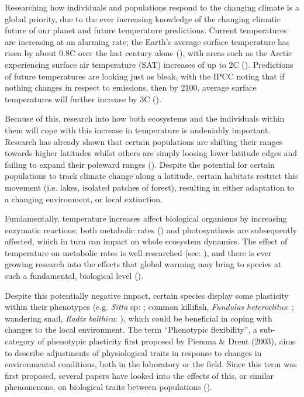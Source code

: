 \documentclass[../../Paper.tex]{subfiles}
\begin{document}
Researching how individuals and populations respond to the changing climate is a global priority,
due to the ever increasing knowledge of the changing climatic future of our planet 
and future temperature predictions. Current temperatures are 
increasing at an alarming rate; the Earth's average surface temperature has risen
by about 0.8\degree C over the last century alone (\cite{ipcc_climate_2014}),
with areas such as the Arctic experiencing surface air temperature (SAT)
increases of up to 2\degree C (\cite{przybylak_recent_2007}). Predictions 
of future temperatures are looking just as bleak, with the IPCC noting 
that if nothing changes in respect to emissions, then by 2100, average surface
temperatures will further increase by 3\degree C (\cite{ipcc_climate_2014}).

Because of this, research into how both ecosystems and the individuals
within them will cope with this increase in temperature is undeniably 
important. Research has already shown that certain populations are 
shifting their ranges towards higher latitudes whilst others
 are simply loosing lower latitude edges and failing to expand their poleward ranges
(\cite{chen_rapid_2011, sunday_thermal-safety_2014, kerr_climate_2015}). Despite 
the potential for certain populations to track climate change along a latitude,
certain habitats restrict this movement (i.e. lakes, isolated patches of forest),
resulting in either adaptation to a changing environment, or local extinction.

Fundamentally, temperature increases affect biological organisms by increasing enzymatic 
reactions; both metabolic rates (\cite{gillooly_effects_2001}) and photosynthesis are subsequently 
affected, which in turn can impact 
on whole ecosystem dynamics. The effect of temperature
on metabolic rates is well researched (see: \cite{brown_toward_2004,price_metabolic_2010}), 
and there is  ever growing research into the effects that global warming may bring to species at
such a fundamental, biological level (\cite{clusella-trullas_climatic_2011,manciocco_global_2014,gandar_adaptive_2017}).

Despite this potentially negative impact, certain species display some plasticity within their
phenotypes (e.g. \textit{Sitta} sp: \cite{ghalambor_comparative_2002}; common killifish,
\textit{Fundulus heteroclitus}: \cite{schulte_thermal_2011};
wandering snail, \textit{Radix balthica}: \cite{ahlgren_camouflaged_2013}),
which could be beneficial in coping with changes to the local environment. The term 
``Phenotypic flexibility'', a sub-category of phenotypic plasticity first proposed by Piersma \& Drent (2003), aims to describe
adjustments of physiological traits in response to changes in environmental conditions, 
both in the laboratory or the field. Since this term was first proposed, several papers
have looked into the effects of this, or similar phenomenons, on biological traits between populations 
(\cite{mckechnie_phenotypic_2008,marshall_warming_2011,ahlgren_camouflaged_2013}).
\end{document}
